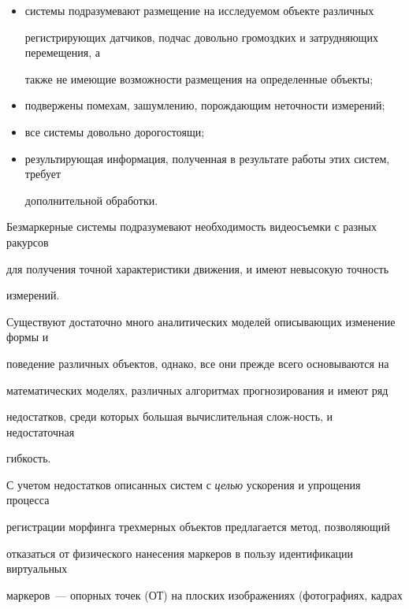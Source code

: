 \begin{itemize}


\item системы подразумевают размещение на исследуемом объекте различных 


регистрирующих датчиков, подчас до\-воль\-но громоздких и затрудняющих перемещения, а 


также не имеющие возможности размещения на определенные объекты;


\item подвержены помехам, зашумлению, порождающим неточности измерений;


\item все системы довольно дорогостоящи;


\item результирующая информация, полученная в результате работы этих систем, требует 


дополнительной обработки.


\end{itemize}





Безмаркерные системы подразумевают необходимость видеосъемки с разных ракурсов 


для получения точной ха\-рак\-те\-ри\-сти\-ки движения, и имеют невысокую точность 


измерений.





Существуют достаточно много аналитических моделей описывающих изменение формы и 


поведение различных объектов, однако, все они прежде всего основываются на 


математических моделях, различных алгоритмах прогнозирования и имеют ряд 


недостатков, среди которых большая вычислительная слож-\linebreak ность, и недостаточная 


гибкость.





С учетом недостатков описанных систем с \textit{целью} ускорения и упрощения процесса 


регистрации морфинга трехмерных объектов предлагается метод, позволяющий 


отказаться от физического нанесения маркеров в пользу идентификации виртуальных 


маркеров~--- опорных точек (ОТ) на плоских изображениях (фотографиях, кадрах 


